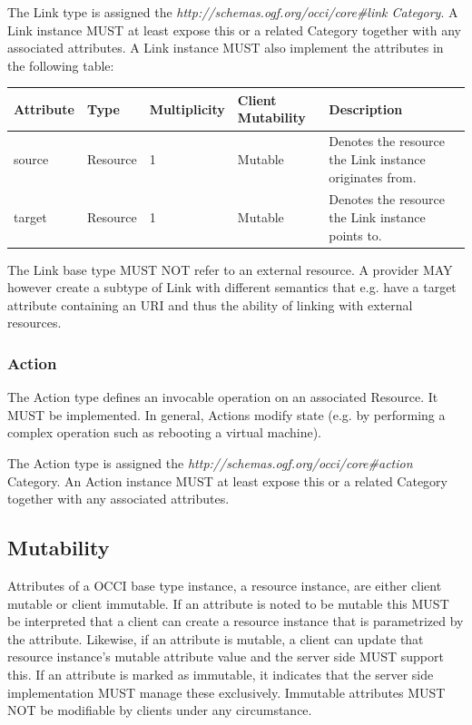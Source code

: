 \documentclass[10pt,a4paper,british]{article}
\begin{document}
The Link type is assigned the
\textit{http://schemas.ogf.org/occi/core\#link Category}. A Link
instance MUST at least expose this or a related Category together with
any associated attributes. A Link instance MUST also implement the
attributes in the following table:

\begin{tabular}{l|l|l|l|p{2.7in}}
Attribute & Type & Multiplicity & Client Mutability & Description \\
\hline
source & Resource & 1 & Mutable & Denotes the resource the Link instance originates from.\\
target & Resource & 1 & Mutable & Denotes the resource the Link instance points to.\\
\end{tabular}

The Link base type MUST NOT refer to an external resource. A provider
MAY however create a subtype of Link with different semantics that
e.g. have a target attribute containing an URI and thus the ability of
linking with external resources.

\subsubsection{Action}
The Action type defines an invocable operation on an associated
Resource. It MUST be implemented. In general, Actions modify state
(e.g. by performing a complex operation such as rebooting a virtual
machine).

The Action type is assigned the
\textit{http://schemas.ogf.org/occi/core\#action} Category. An Action
instance MUST at least expose this or a related Category together with
any associated attributes.

\subsection{Mutability}
Attributes of a OCCI base type instance, a resource instance, are
either client mutable or client immutable. If an attribute is noted to
be mutable this MUST be interpreted that a client can create a
resource instance that is parametrized by the attribute. Likewise, if
an attribute is mutable, a client can update that resource instance's
mutable attribute value and the server side MUST support this. If an
attribute is marked as immutable, it indicates that the server side
implementation MUST manage these exclusively. Immutable attributes
MUST NOT be modifiable by clients under any circumstance.
\end{document}
